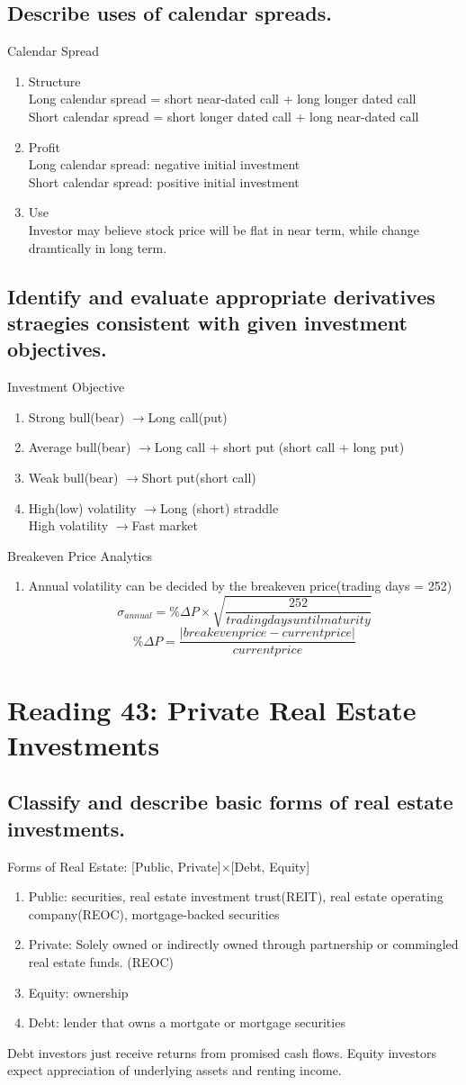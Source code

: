 \documentclass{article}
\newcommand{\be}{\begin{enumerate}}
\newcommand{\ee}{\end{enumerate}}
\newcommand{\ra}{$\rightarrow$}
\begin{document}
\subsection{Describe uses of calendar spreads.}
Calendar Spread
\be
    \item Structure
    \\ Long calendar spread = short near-dated call + long longer dated call
    \\ Short calendar spread = short longer dated call + long near-dated call
    \item Profit
    \\ Long calendar spread: negative initial investment
    \\ Short calendar spread: positive initial investment
    \item Use
    \\ Investor may believe stock price will be flat in near term, while change dramtically
    in long term.
\ee
\subsection{Identify and evaluate appropriate derivatives straegies consistent with
given investment objectives.}
Investment Objective
\be
    \item Strong bull(bear) \ra Long call(put)
    \item Average bull(bear) \ra Long call + short put (short call + long put)
    \item Weak bull(bear) \ra Short put(short call)
    \item High(low) volatility \ra Long (short) straddle
    \\ High volatility \ra Fast market
\ee
Breakeven Price Analytics
\be
    \item Annual volatility can be decided by the breakeven price(trading days = 252)
        $$
            \sigma_{annual} = \%\Delta P\times\sqrt{\frac{252}{trading days until maturity}}
        $$
        $$
            \%\Delta P=\frac{|break even price - current price|}{current price}
        $$
\ee


\section{Reading 43: Private Real Estate Investments}
\subsection{Classify and describe basic forms of real estate investments.}
Forms of Real Estate: [Public, Private]$\times$[Debt, Equity]
\be
    \item Public: securities, real estate investment trust(REIT), real estate operating
    company(REOC), mortgage-backed securities
    \item Private: Solely owned or indirectly owned through partnership or 
    commingled real estate funds. (REOC)
    \item Equity: ownership
    \item Debt: lender that owns a mortgate or mortgage securities
\ee
Debt investors just receive returns from promised cash flows. Equity investors expect
appreciation of underlying assets and renting income.
\end{document}
